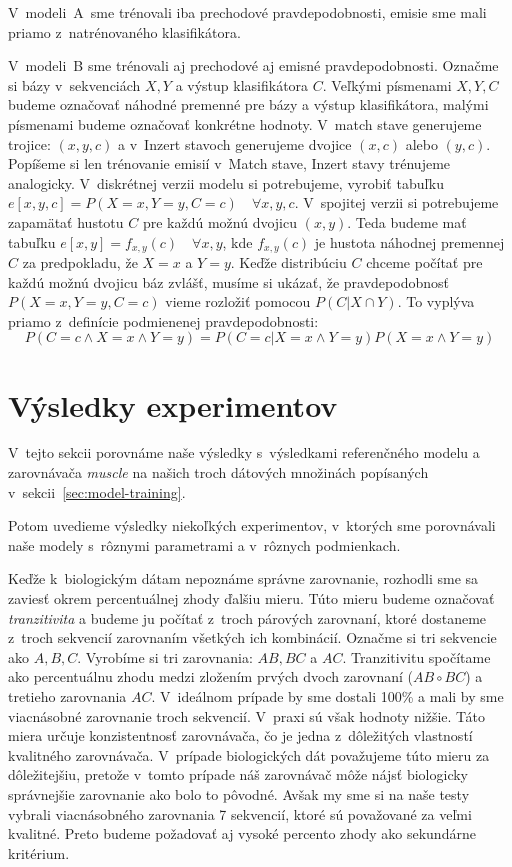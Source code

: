 V~modeli~A~sme trénovali iba prechodové pravdepodobnosti, emisie sme mali priamo z~natrénovaného klasifikátora.

V~modeli~B sme trénovali aj prechodové aj emisné pravdepodobnosti.
Označme si bázy v~sekvenciách $X, Y$ a výstup klasifikátora $C$. Veľkými písmenami $X, Y, C$ budeme označovať náhodné premenné pre bázy a výstup klasifikátora, malými písmenami budeme označovať konkrétne hodnoty. V~match stave generujeme trojice: $(x, y, c)$ a v~Inzert stavoch generujeme dvojice $(x, c)$ alebo $(y, c)$. Popíšeme si len trénovanie emisií v~Match stave, Inzert stavy trénujeme analogicky. V~diskrétnej verzii modelu si potrebujeme, vyrobiť tabuľku $e[x, y, c] = P(X=x, Y=y, C=c)\quad \forall x, y, c$. V~spojitej verzii si potrebujeme zapamätať hustotu $C$ pre každú možnú dvojicu $(x, y)$. Teda budeme mať tabuľku $e[x, y] = f_{x,y}(c)\quad \forall x, y$, kde $f_{x,y}(c)$ je hustota náhodnej premennej $C$ za predpokladu, že $X=x$ a $Y=y$.
Keďže distribúciu $C$ chceme počítať pre každú možnú dvojicu báz zvlášť, musíme si ukázať, že pravdepodobnosť $P(X=x, Y=y, C=c)$ vieme rozložiť pomocou $P(C|X \cap Y)$. To vyplýva priamo z~definície podmienenej pravdepodobnosti:
$$P\left(C=c \wedge X=x \wedge Y=y\right) = P\left(C=c | X=x \wedge Y=y\right) P\left(X=x \wedge Y=y\right)$$

\section{Výsledky experimentov}
V~tejto sekcii porovnáme naše výsledky s~výsledkami referenčného modelu a zarovnávača \textit{muscle} \cite{edgar2004muscle} na našich troch dátových množinách popísaných v~sekcii~\ref{sec:model-training}.

Potom uvedieme výsledky niekoľkých experimentov, v~ktorých sme porovnávali naše modely s~rôznymi parametrami a v~rôznych podmienkach.

Keďže k~biologickým dátam nepoznáme správne zarovnanie, rozhodli sme sa zaviesť okrem percentuálnej zhody ďalšiu mieru. Túto mieru budeme označovať \textit{tranzitivita} a budeme ju počítať z~troch párových zarovnaní, ktoré dostaneme z~troch sekvencií zarovnaním všetkých ich kombinácií. Označme si tri  sekvencie ako $A, B, C$. Vyrobíme si tri zarovnania: $AB, BC$ a $AC$. Tranzitivitu spočítame ako percentuálnu zhodu medzi zložením prvých dvoch zarovnaní ($AB \circ BC$) a tretieho zarovnania $AC$. V~ideálnom prípade by sme dostali 100\% a mali by sme viacnásobné zarovnanie troch sekvencií. V~praxi sú však hodnoty nižšie.
Táto miera určuje konzistentnosť zarovnávača, čo je jedna z~dôležitých vlastností kvalitného zarovnávača. V~prípade biologických dát považujeme túto mieru za dôležitejšiu, pretože v~tomto prípade náš zarovnávač môže nájsť biologicky správnejšie zarovnanie ako bolo to pôvodné. Avšak my sme si na naše testy vybrali viacnásobného zarovnania 7 sekvencií, ktoré sú považované za veľmi kvalitné. Preto budeme požadovať aj vysoké percento zhody ako sekundárne kritérium.

